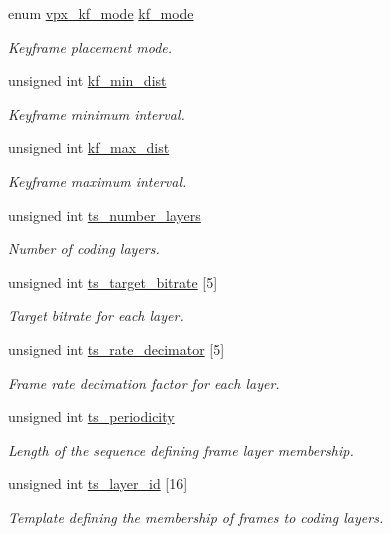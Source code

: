 \begin{DoxyCompactItemize}
enum \hyperlink{group__encoder_ga9f461802aa4db35c04a8b23837987f40}{vpx\-\_\-kf\-\_\-mode} \hyperlink{structvpx__codec__enc__cfg_a491d67f061dcdb13f60c017563e9d788}{kf\-\_\-mode}
\begin{DoxyCompactList}\small\item\em Keyframe placement mode. \end{DoxyCompactList}\item 
unsigned int \hyperlink{structvpx__codec__enc__cfg_a0a7b5444ecb09745cbe8d5af17553846}{kf\-\_\-min\-\_\-dist}
\begin{DoxyCompactList}\small\item\em Keyframe minimum interval. \end{DoxyCompactList}\item 
unsigned int \hyperlink{structvpx__codec__enc__cfg_ae018440136e271743376730413d25a9b}{kf\-\_\-max\-\_\-dist}
\begin{DoxyCompactList}\small\item\em Keyframe maximum interval. \end{DoxyCompactList}\item 
unsigned int \hyperlink{structvpx__codec__enc__cfg_a16d4549a30cbd585e3c3056ef873d8c7}{ts\-\_\-number\-\_\-layers}
\begin{DoxyCompactList}\small\item\em Number of coding layers. \end{DoxyCompactList}\item 
unsigned int \hyperlink{structvpx__codec__enc__cfg_aba7ceb7a90500a8f76aff89575737f3a}{ts\-\_\-target\-\_\-bitrate} \mbox{[}5\mbox{]}
\begin{DoxyCompactList}\small\item\em Target bitrate for each layer. \end{DoxyCompactList}\item 
unsigned int \hyperlink{structvpx__codec__enc__cfg_ad40c30846ef8ef1d8684f10a491ec535}{ts\-\_\-rate\-\_\-decimator} \mbox{[}5\mbox{]}
\begin{DoxyCompactList}\small\item\em Frame rate decimation factor for each layer. \end{DoxyCompactList}\item 
unsigned int \hyperlink{structvpx__codec__enc__cfg_a4ec338780115dd270acf0dac24193474}{ts\-\_\-periodicity}
\begin{DoxyCompactList}\small\item\em Length of the sequence defining frame layer membership. \end{DoxyCompactList}\item 
unsigned int \hyperlink{structvpx__codec__enc__cfg_a4d105d2470dbfb7210b33d298f1cf1f6}{ts\-\_\-layer\-\_\-id} \mbox{[}16\mbox{]}
\begin{DoxyCompactList}\small\item\em Template defining the membership of frames to coding layers. \end{DoxyCompactList}\end{DoxyCompactItemize}


